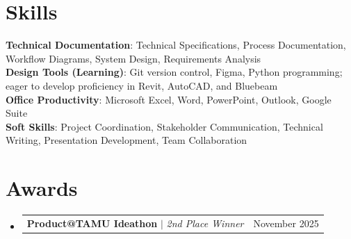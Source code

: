 \documentclass[letterpaper,11pt]{article}
\makeatletter
\newcommand{\resumeProjectHeading}[2]{
    \item
    \begin{tabular*}{0.97\textwidth}{l@{\extracolsep{\fill}}r}
      \small#1 & #2 \\
    \end{tabular*}\vspace{-7pt}
}
\newcommand{\resumeSubHeadingListStart}{\begin{itemize}[leftmargin=0.15in, label={}]}
\newcommand{\resumeSubHeadingListEnd}{\end{itemize}}
\makeatother
\begin{document}
\section{Skills}
 \begin{itemize}[leftmargin=0.15in, label={}]
    \small{\item{
     \textbf{Technical Documentation}{: Technical Specifications, Process Documentation, Workflow Diagrams, System Design, Requirements Analysis} \\
     \textbf{Design Tools (Learning)}{: Git version control, Figma, Python programming; eager to develop proficiency in Revit, AutoCAD, and Bluebeam} \\
     \textbf{Office Productivity}{: Microsoft Excel, Word, PowerPoint, Outlook, Google Suite} \\
     \textbf{Soft Skills}{: Project Coordination, Stakeholder Communication, Technical Writing, Presentation Development, Team Collaboration} \\
    }}
 \end{itemize}

\section{Awards}
  \resumeSubHeadingListStart
    \resumeProjectHeading
      {\textbf{Product@TAMU Ideathon} $|$ \emph{2nd Place Winner}}{November 2025}
  \resumeSubHeadingListEnd

\end{document}
